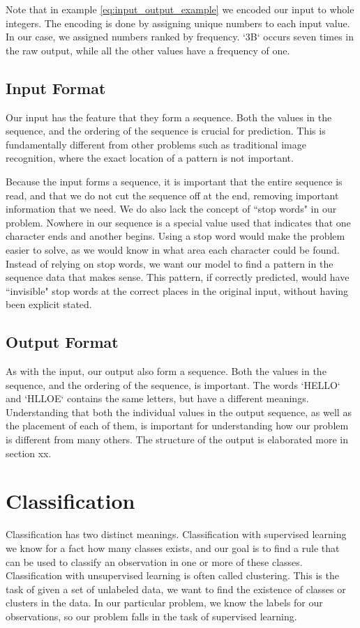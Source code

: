 Note that in example \ref{eq:input_output_example} we encoded our input to whole integers. The encoding is done by assigning unique numbers to each input value. In our case, we assigned numbers ranked by frequency. `3B` occurs seven times in the raw output, while all the other values have a frequency of one.

\subsection{Input Format}
Our input has the feature that they form a sequence. Both the values in the sequence, and the ordering of the sequence is crucial for prediction. This is fundamentally different from other problems such as traditional image recognition, where the exact location of a pattern is not important.

Because the input forms a sequence, it is important that the entire sequence is read, and that we do not cut the sequence off at the end, removing important information that we need. We do also lack the concept of ``stop words" in our problem. Nowhere in our sequence is a special value used that indicates that one character ends and another begins. Using a stop word would make the problem easier to solve, as we would know in what area each character could be found. Instead of relying on stop words, we want our model to find a pattern in the sequence data that makes sense. This pattern, if correctly predicted, would have ``invisible" stop words at the correct places in the original input, without having been explicit stated.


\subsection{Output Format}
As with the input, our output also form a sequence. Both the values in the sequence, and the ordering of the sequence, is important. The words `HELLO` and `HLLOE` contains the same letters, but have a different meanings. Understanding that both the individual values in the output sequence, as well as the placement of each of them, is important for understanding how our problem is different from many others. The structure of the output is elaborated more in section xx.


\section{Classification}
\label{sec:classification_explanation}
Classification has two distinct meanings. Classification with supervised learning we know for a fact how many classes exists, and our goal is to find a rule that can be used to classify an observation in one or more of these classes. Classification with unsupervised learning is often called clustering. This is the task of given a set of unlabeled data, we want to find the existence of classes or clusters in the data. In our particular problem, we know the labels for our observations, so our problem falls in the task of supervised learning.

